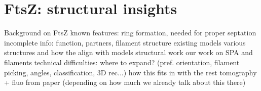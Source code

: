 \chapter{FtsZ: structural insights}

\begin{outline}
\1 Background on FtsZ
    \2 known features: ring formation, needed for proper septation
    \2 incomplete info: function, partners, filament structure
    \2 existing models
    \2 \cite{lutkenhausBacterialCytokinesisRing2012,szwedziakArchitectureRingFormed2014,fujitaStructuresFtsZSingle2023,sextonSuperresolutionConfocalCryoCLEM2022,liStructureFtsZFilaments2007}
    \2 various structures and how the align with models
\1 structural work
    \2 our work on SPA and filaments
        \3 technical difficulties: where to expand? (pref. orientation, filament picking, angles, classification, 3D rec...)
    \2 how this fits in with the rest
    \2 tomography + fluo from paper (depending on how much we already talk about this there)
\end{outline}
